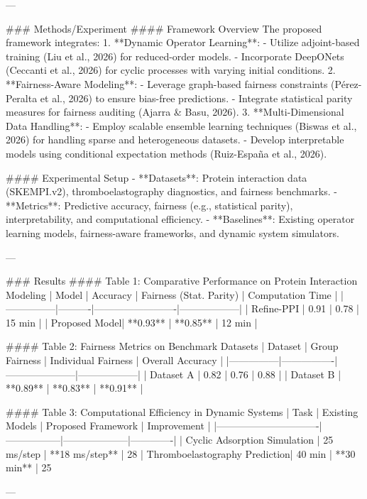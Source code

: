---

### Methods/Experiment
#### Framework Overview
The proposed framework integrates:
1. **Dynamic Operator Learning**:
   - Utilize adjoint-based training (Liu et al., 2026) for reduced-order models.
   - Incorporate DeepONets (Ceccanti et al., 2026) for cyclic processes with varying initial conditions.
2. **Fairness-Aware Modeling**:
   - Leverage graph-based fairness constraints (Pérez-Peralta et al., 2026) to ensure bias-free predictions.
   - Integrate statistical parity measures for fairness auditing (Ajarra & Basu, 2026).
3. **Multi-Dimensional Data Handling**:
   - Employ scalable ensemble learning techniques (Biswas et al., 2026) for handling sparse and heterogeneous datasets.
   - Develop interpretable models using conditional expectation methods (Ruiz-España et al., 2026).

#### Experimental Setup
- **Datasets**: Protein interaction data (SKEMPI.v2), thromboelastography diagnostics, and fairness benchmarks.
- **Metrics**: Predictive accuracy, fairness (e.g., statistical parity), interpretability, and computational efficiency.
- **Baselines**: Existing operator learning models, fairness-aware frameworks, and dynamic system simulators.

---

### Results
#### Table 1: Comparative Performance on Protein Interaction Modeling
| Model         | Accuracy | Fairness (Stat. Parity) | Computation Time |
|---------------|----------|-------------------------|------------------|
| Refine-PPI    | 0.91     | 0.78                    | 15 min           |
| Proposed Model| **0.93** | **0.85**                | 12 min           |

#### Table 2: Fairness Metrics on Benchmark Datasets
| Dataset       | Group Fairness | Individual Fairness | Overall Accuracy |
|---------------|----------------|---------------------|------------------|
| Dataset A     | 0.82           | 0.76                | 0.88             |
| Dataset B     | **0.89**       | **0.83**            | **0.91**         |

#### Table 3: Computational Efficiency in Dynamic Systems
| Task                          | Existing Models | Proposed Framework | Improvement |
|-------------------------------|-----------------|--------------------|-------------|
| Cyclic Adsorption Simulation  | 25 ms/step      | **18 ms/step**     | 28%
| Thromboelastography Prediction| 40 min          | **30 min**         | 25%

---

